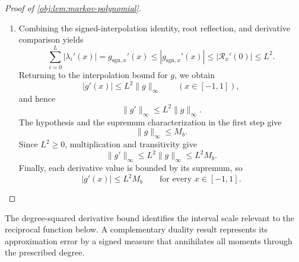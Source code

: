 \documentclass[11pt]{article}
\begin{document}
\begin{proof}[Proof of \cref{obj:lem:markov-polynomial}]
\begin{enumerate}
Suppose, for a contradiction, that
\(|\mathcal R_x'(0)|>|\mathcal S'(0)|\), and define
\[
\lambda_{\mathrm{der}}:=
\frac{\mathcal R_x'(0)}{\mathcal S'(0)},
\qquad
\mathcal E_x(z):=\mathcal R_x(z)-\lambda_{\mathrm{der}}\mathcal S(z).
\]
Then
\[
|\lambda_{\mathrm{der}}|>1,\qquad \mathcal E_x'(0)=0.
\]
For \(\operatorname{Re}z\ge0\), the equality \(\mathcal E_x(z)=0\) would imply
\(\mathcal F_x(z)=\lambda_{\mathrm{der}}\), contradicting the quotient bound.
Thus every root of \(\mathcal E_x\) lies in the open left half-plane.

If \(\mathcal E_x\) is nonconstant, the Gauss--Lucas theorem places every root of its derivative in the convex hull of its roots, hence in the open left half-plane. This contradicts \(\mathcal E_x'(0)=0\).
If \(\mathcal E_x\) is constant, define
\[
c_{\mathcal E}:=\mathcal E_x(0).
\]
Then
\[
\mathcal F_x(iy)
=\lambda_{\mathrm{der}}+\frac{c_{\mathcal E}}{\mathcal S(iy)}
\longrightarrow\lambda_{\mathrm{der}}
\quad\text{as }y\to+\infty,
\]
because \(\deg\mathcal S=L>0\). The boundary bound implies
\(|\lambda_{\mathrm{der}}|\le1\), again a contradiction. We conclude that
\[
|\mathcal R_x'(0)|\le|\mathcal S'(0)|=L^2.
\]

\item Combining the signed-interpolation identity, root reflection, and derivative comparison yields
\[
\sum_{i=0}^{L}|\lambda_i'(x)|
=g_{\mathrm{sgn},x}'(x)
\le |g_{\mathrm{sgn},x}'(x)|
\le|\mathcal R_x'(0)|
\le L^2.
\]
Returning to the interpolation bound for \(g\), we obtain
\[
|g'(x)|\le L^2\|g\|_{\infty}
\qquad(x\in[-1,1]),
\]
and hence
\[
\|g'\|_{\infty}\le L^2\|g\|_{\infty}.
\]
The hypothesis and the supremum characterization in the first step give
\[
\|g\|_{\infty}\le M_b.
\]
Since \(L^2\ge0\), multiplication and transitivity give
\[
\|g'\|_{\infty}
\le L^2\|g\|_{\infty}
\le L^2M_b.
\]
Finally, each derivative value is bounded by its supremum, so
\[
|g'(x)|\le L^2M_b
\qquad\text{for every }x\in[-1,1].
\]
\end{enumerate}
\end{proof}

The degree-squared derivative bound identifies the interval scale relevant to the reciprocal function below. A complementary duality result represents its approximation error by a signed measure that annihilates all moments through the prescribed degree.
\end{document}
